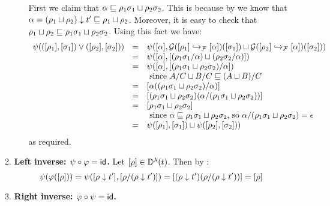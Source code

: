 \begin{enumerate}
\begin{enumerate}
\begin{enumerate}
      First we claim that $\alpha \sqsubseteq \rho_1\sigma_1 \sqcup \rho_2\sigma_2$.
      This is because by 
      we know that $\alpha = (\rho_1 \sqcup \rho_2) \downarrow t' \sqsubseteq \rho_1 \sqcup \rho_2$.
      Moreover, it is easy to check that
      $\rho_1 \sqcup \rho_2 \sqsubseteq \rho_1\sigma_1 \sqcup \rho_2\sigma_2$.
      Using this fact we have:
      \[
      \begin{array}{rcll}
        \psi(({[\rho_1]},{[\sigma_1]}) \lor ({[\rho_2]},{[\sigma_2]}))
      & = &
        \psi({[\alpha]},\mathcal{G}({[\rho_1]} \hookrightarrow_{\mathcal{F}} {[\alpha]})({[\sigma_1]}) \sqcup \mathcal{G}({[\rho_2]} \hookrightarrow_{\mathcal{F}} {[\alpha]})({[\sigma_2]}))
      \\
      & = &
        \psi({[\alpha]}, {[(\rho_1\sigma_1/\alpha) \sqcup (\rho_2\sigma_2/\alpha)]})
      \\
      & = &
        \psi({[\alpha]}, {[(\rho_1\sigma_1 \sqcup \rho_2\sigma_2)/\alpha]})
      \\&&\text{ since $A/C \sqcup B/C \sqsubseteq (A \sqcup B)/C$} \\
      & = &
        {[\alpha((\rho_1\sigma_1 \sqcup \rho_2\sigma_2)/\alpha)]} \\
      & = &
        {[(\rho_1\sigma_1 \sqcup \rho_2\sigma_2)(\alpha/(\rho_1\sigma_1 \sqcup \rho_2\sigma_2))]} \\
      & = &
        {[\rho_1\sigma_1 \sqcup \rho_2\sigma_2]}
        \\&&\text{ since
                     $\alpha \sqsubseteq \rho_1\sigma_1 \sqcup \rho_2\sigma_2$,
                   so $\alpha/(\rho_1\sigma_1 \sqcup \rho_2\sigma_2) = \epsilon$} \\
      & = &
        \psi({[\rho_1]},{[\sigma_1]}) \sqcup \psi({[\rho_2]},{[\sigma_2]}))
      \end{array}
      \]
      as required.
    \end{enumerate}
  \item {\bf Left inverse: $\psi \circ \varphi = \mathsf{id}$.}
    Let ${[\rho]} \in \mathbb{D}^{\lambda}(t)$.
    Then by :
    \[
      \psi(\varphi({[\rho]}))
      = \psi({[\rho \downarrow t']}, {[\rho/(\rho \downarrow t')]})
      = {[(\rho \downarrow t')(\rho/(\rho \downarrow t'))]}
      = {[\rho]}
    \]
  \item {\bf Right inverse: $\varphi \circ \psi = \mathsf{id}$.}

\end{enumerate}
\end{enumerate}
